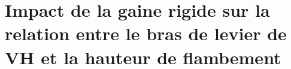 

\lhead[\fancyplain{}{\leftmark}]%
      {\fancyplain{}{}} %
\chead[\fancyplain{}{}]%
      {\fancyplain{}{}}
\rhead[\fancyplain{}{}]%
      {\fancyplain{}{\rightmark}}%
\lfoot[\fancyplain{}{}]%
      {\fancyplain{}{}}
\cfoot[\fancyplain{}{\thepage}]%
      {\fancyplain{}{\thepage}} %
\rfoot[\fancyplain{}{}]%
     {\fancyplain{}{\scriptsize}}



\chapter{Impact de la gaine rigide sur la relation entre le bras de levier de VH et la hauteur de flambement}
\label{Ann:2_calcul a_la avec Dg, x0 et Dte fixes}

\minitoc
\newpage

